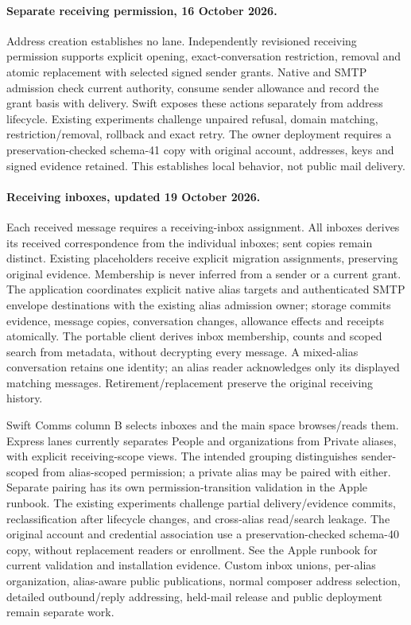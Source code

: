 \documentclass[11pt]{article}
\begin{document}
\paragraph{Separate receiving permission, 16 October 2026.}
Address creation establishes no lane. Independently revisioned receiving permission
supports explicit opening, exact-conversation restriction, removal and atomic
replacement with selected signed sender grants. Native and SMTP admission check
current authority, consume sender allowance and record the grant basis with delivery.
Swift exposes these actions separately from address lifecycle. Existing experiments
challenge unpaired refusal, domain matching, restriction/removal, rollback and exact
retry. The owner deployment requires a preservation-checked schema-41 copy with
original account, addresses, keys and signed evidence retained. This establishes
local behavior, not public mail delivery.

\paragraph{Receiving inboxes, updated 19 October 2026.}
Each received message requires a receiving-inbox assignment. All inboxes derives
its received correspondence from the individual inboxes; sent copies remain
distinct. Existing placeholders receive explicit migration assignments, preserving
original evidence. Membership is never inferred from a sender or a current grant.
The application coordinates explicit native alias targets and authenticated
SMTP envelope destinations with the existing alias admission owner; storage commits
evidence, message copies, conversation changes, allowance effects and receipts
atomically. The portable client derives inbox membership, counts and scoped search
from metadata, without decrypting every message. A mixed-alias conversation retains
one identity; an alias reader acknowledges only its displayed matching messages.
Retirement/replacement preserve the original receiving history.

Swift Comms column B selects inboxes and the main space browses/reads them. Express
lanes currently separates People and organizations from Private aliases, with
explicit receiving-scope views. The intended grouping distinguishes sender-scoped
from alias-scoped permission; a private alias may be paired with either. Separate
pairing has its own permission-transition validation in the Apple runbook. The existing experiments challenge partial delivery/evidence
commits, reclassification after lifecycle changes, and cross-alias read/search
leakage. The original account and credential association use a preservation-checked
schema-40 copy, without replacement readers or enrollment. See the Apple runbook
for current validation and installation evidence. Custom inbox unions, per-alias
organization, alias-aware public publications, normal composer address selection,
detailed outbound/reply addressing, held-mail release and public deployment remain
separate work.
\end{document}
